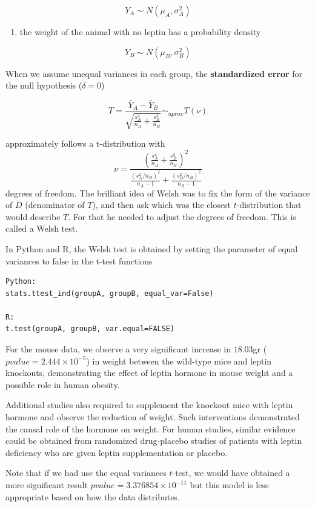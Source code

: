 \documentclass[
]{book}
\providecommand{\tightlist}{%
  \setlength{\itemsep}{0pt}\setlength{\parskip}{0pt}}
\begin{document}
\[Y_A \sim N(\mu_A, \sigma_A^2)\]

\begin{enumerate}
\def\labelenumi{\arabic{enumi}.}
\setcounter{enumi}{1}
\tightlist
\item
  the weight of the animal with no leptin has a probability density
\end{enumerate}

\[Y_B \sim N(\mu_B, \sigma_B^2)\]

When we assume unequal variances in each group, the \textbf{standardized error} for the null hypothesis (\(\delta=0\))

\[T=\frac{\bar{Y}_A-\bar{Y}_B }{\sqrt{\frac{s_A^2}{n_A}+\frac{s_B^2}{n_B}}} \sim_{aprox} T(\nu)\]

approximately follows a t-distribution with
\[\nu=\frac{(\frac{s_A^2}{n_A}+\frac{s_B^2}{n_B})^2}{\frac{(s_A^2/n_B)^2}{n_A-1}+\frac{(s_B^2/n_B)^2}{n_B-1}}\]
degrees of freedom. The brilliant idea of Welsh was to fix the form of the variance of \(D\) (denominator of \(T\)), and then ask which was the closest \(t\)-distribution that would describe \(T\). For that he needed to adjust the degrees of freedom. This is called a Welsh test.

In Python and R, the Welsh test is obtained by setting the parameter of equal variances to false in the t-test functions

\begin{verbatim}
Python:
stats.ttest_ind(groupA, groupB, equal_var=False)

R:
t.test(groupA, groupB, var.equal=FALSE)
\end{verbatim}

For the mouse data, we observe a very significant increase in \(18.03\)gr (\(pvalue=2.444 \times 10^{-5}\)) in weight between the wild-type mice and leptin knockouts, demonstrating the effect of leptin hormone in mouse weight and a possible role in human obesity.

Additional studies also required to supplement the knockout mice with leptin hormone and observe the reduction of weight. Such interventions demonstrated the causal role of the hormone on weight. For human studies, similar evidence could be obtained from randomized drug-placebo studies of patients with leptin deficiency who are given leptin supplementation or placebo.

Note that if we had use the equal variances \(t\)-test, we would have obtained a more significant result \(pvalue=3.376854 \times 10^{-11}\) but this model is less appropriate based on how the data distributes.
\end{document}
